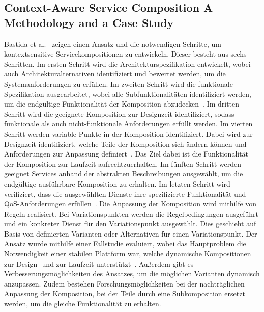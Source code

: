 \documentclass[conference,compsoc]{IEEEtran}
\begin{document}
\subsection{Context-Aware Service Composition  A Methodology and a Case Study}
Bastida et al.~\cite{bastida2008context} zeigen einen Ansatz und die notwendigen Schritte, um kontextsensitive Servicekompositionen zu entwickeln. Dieser besteht aus sechs Schritten. Im ersten Schritt wird die Architekturspezifikation entwickelt, wobei auch Architekturalternativen identifiziert und bewertet werden, um die Systemanforderungen zu erfüllen. Im zweiten Schritt wird die funktionale Spezifikation ausgearbeitet, wobei alle Subfunktionalitäten identifiziert werden, um die endgültige Funktionalität der Komposition abzudecken~\cite{bastida2008context}. Im dritten Schritt wird die geeignete Komposition zur Designzeit identifiziert, sodass funktionale als auch nicht-funktionale Anforderungen erfüllt werden. Im vierten Schritt werden variable Punkte in der Komposition identifiziert. Dabei wird zur Designzeit identifiziert, welche Teile der Komposition sich ändern können und Anforderungen zur Anpassung definiert~\cite{bastida2008context}. Das Ziel dabei ist die Funktionalität der Komposition zur Laufzeit aufrechtzuerhalten. Im fünften Schritt werden geeignet Services anhand der abstrakten Beschreibungen ausgewählt, um die endgültige ausführbare Komposition zu erhalten. Im letzten Schritt wird verifiziert, dass die ausgewählten Dienste ihre spezifizierte Funktionalität und QoS-Anforderungen erfüllen~\cite{bastida2008context}.
Die Anpassung der Komposition wird mithilfe von Regeln realisiert. Bei Variationspunkten werden die Regelbedingungen ausgeführt und ein konkreter Dienst für den Variationspunkt ausgewählt. Dies geschieht auf Basis von definierten Varianten oder Alternativen für einen Variationspunkt.
Der Ansatz wurde mithilfe einer Fallstudie evaluiert, wobei das Hauptproblem die Notwendigkeit einer stabilen Plattform war, welche dynamische Kompositionen zur Design- und zur Laufzeit unterstützt~\cite{bastida2008context}. Außerdem gibt es Verbesserungsmöglichkeiten des Ansatzes, um die möglichen Varianten dynamisch anzupassen. Zudem bestehen Forschungsmöglichkeiten bei der nachträglichen Anpassung der Komposition, bei der Teile durch eine Subkomposition ersetzt werden, um die gleiche Funktionalität zu erhalten.
\end{document}
